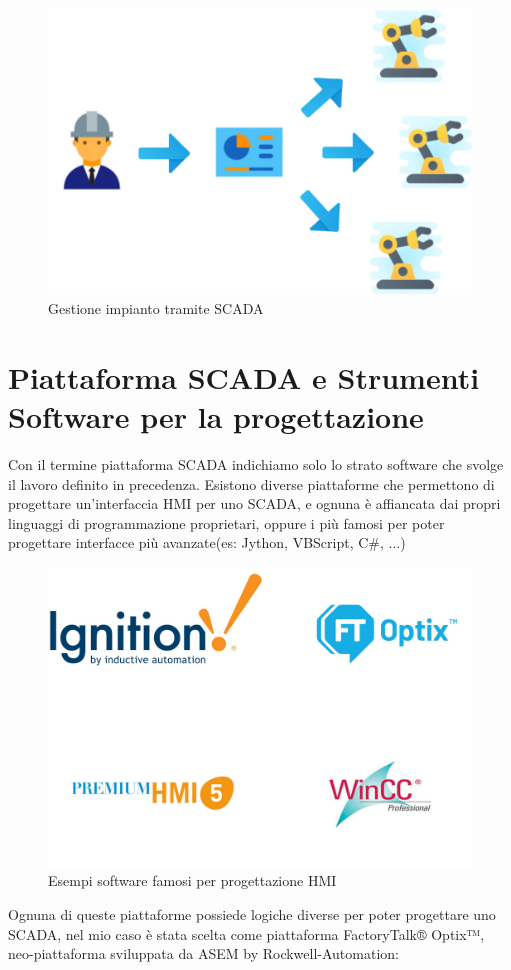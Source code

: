 \begin{figure}
    \centering
    \includegraphics[width=0.5\linewidth]{Immagini/Operatore_SCADA.jpg}
    \caption{Gestione impianto tramite SCADA}
    \label{fig:Operatore_SCADA.jpg}
\end{figure}

\section{Piattaforma SCADA e Strumenti Software per la progettazione}
Con il termine piattaforma SCADA indichiamo solo lo strato software che svolge il lavoro definito in precedenza. Esistono diverse piattaforme che permettono di progettare un'interfaccia HMI per uno SCADA, e ognuna è affiancata dai propri linguaggi di programmazione proprietari, oppure i più famosi per poter progettare interfacce più avanzate(es: Jython, VBScript, C\#, ...)

\begin{figure} [ht]
    \centering
    \includegraphics[width=0.5\linewidth]{Immagini/loghi.jpg}
    \caption{Esempi software famosi per progettazione HMI}
    \label{fig:loghi.jpg}
\end{figure}

Ognuna di queste piattaforme possiede logiche diverse per poter progettare uno SCADA, nel mio caso è stata scelta come piattaforma FactoryTalk® Optix™, neo-piattaforma sviluppata da ASEM by Rockwell-Automation: 

